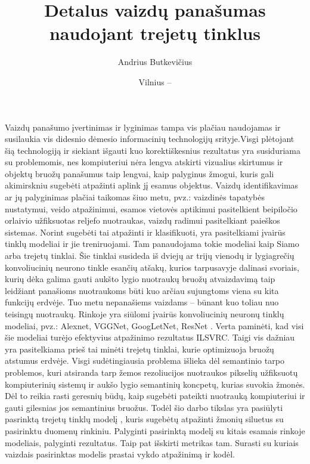\documentclass{VUMIFPSkursinis}
\title{Detalus vaizdų panašumas naudojant trejetų tinklus}
\author{Andrius Butkevičius}
\date{Vilnius – \the\year }
\begin{document}
\maketitle
\thispagestyle{empty} 

\tableofcontents



\thispagestyle{empty} 
Vaizdų panašumo įvertinimas ir lyginimas tampa vis plačiau naudojamas ir susilaukia vis didesnio dėmesio informacinių technologijų srityje.Visgi plėtojant šią technologiją ir siekiant išgauti kuo korektiškesnius rezultatus yra susiduriama su problemomis, nes kompiuteriui nėra lengva atskirti vizualius skirtumus ir objektų bruožų panašumus taip lengvai, kaip palyginus žmogui, kuris gali akimirskniu sugebėti atpažinti aplink jį esamus objektus. Vaizdų identifikavimas ar jų palyginimas plačiai taikomas šiuo metu, pvz.: vaizdinės tapatybės nustatymui, veido atpažinimui, esamos vietovės aptikimui pasitelkient beipiločio orlaivio užfiksuotas reljefo nuotraukas, vaizdų radimui pasitelkiant paieškos sistemas. Norint sugebėti tai atpažinti ir klasifikuoti, yra pasitelkiami įvairūs tinklų modeliai ir jie treniruojami. Tam panaudojama tokie modeliai kaip Siamo arba trejetų tinklai. Šie tinklai susideda iš dviejų ar trijų vienodų ir lygiagrečių konvoliucinių neurono tinkle esančių atšakų, kurios tarpusavyje dalinasi svoriais, kurių dėka galima gauti aukšto lygio nuotraukų bruožų atvaizdavimą taip leidžiant panašioms nuotraukoms būti kuo arčiau sujungtoms viena su kita funkcijų erdvėje. Tuo metu nepanašiems vaizdams – būnant kuo toliau nuo teisingų nuotraukų. 
\newline	
Rinkoje yra siūlomi įvairūs konvoliucinių neuronų tinklų modeliai, pvz.: Alexnet, VGGNet, GoogLetNet, ResNet \cite{Aerial_image_similarity}. Verta paminėti, kad visi šie modeliai turėjo efektyvius atpažinimo rezultatus ILSVRC. Taigi vis dažniau yra pasitelkiama prieš tai minėti trejetų tinklai, kurie optimizuoja bruožų atstumus erdvėje. Visgi sudėtingiausia problema išlieka dėl semantinio tarpo problemos, kuri atsiranda tarp žemos rezoliucijos nuotraukos pikselių užfiksuotų kompiuterinių sistemų ir aukšo lygio semantinių koncpetų, kurias suvokia žmonės. Dėl to reikia rasti geresnių būdų, kaip sugebėti pateikti nuotrauką kompiuteriui ir gauti gilesnias jos semantinius bruožus. 
\newline
Todėl šio darbo tikslas yra pasiūlyti pasrinktą trejetų tinklų modelį \cite{Aerial_image_similarity}, kuris sugebėtų atpažinti žmonių siluetus su pasirinktu duomenų rinkiniu. Palyginti pasirinktą modelį su kitais esamais rinkoje modeliais, palyginti rezultatus. Taip pat išskirti metrikas tam. Surasti su kuriais vaizdais pasirinktas modelis prastai vykdo atpažinimą ir kodėl.
\end{document}
